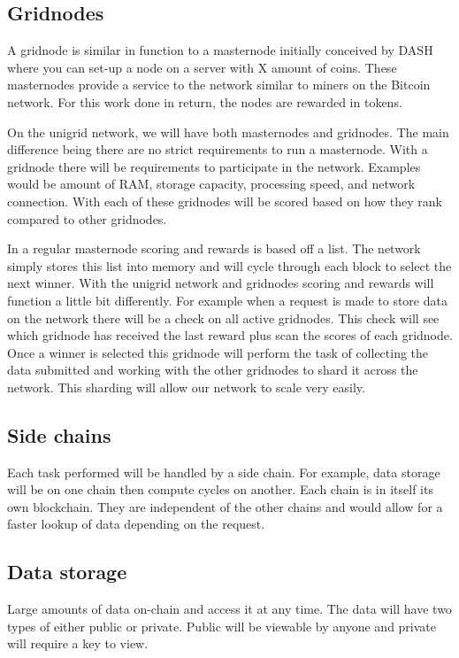 \documentclass[12pt]{article}
\begin{document}
\subsection*{Gridnodes}


A gridnode is similar in function to a masternode initially conceived by DASH where you can set-up a node on a server with X amount of coins. These masternodes provide a service to the network similar to miners on the Bitcoin network. For this work done in return, the nodes are rewarded in tokens.

On the unigrid network, we will have both masternodes and gridnodes. The main difference being there are no strict requirements to run a masternode. With a gridnode there will be requirements to participate in the network. Examples would be amount of RAM, storage capacity, processing speed, and network connection. With each of these gridnodes will be scored based on how they rank compared to other gridnodes.

In a regular masternode scoring and rewards is based off a list. The network simply stores this list into memory and will cycle through each block to select the next winner. With the unigrid network and gridnodes scoring and rewards will function a little bit differently. For example when a request is made to store data on the network there will be a check on all active gridnodes. This check will see which gridnode has received the last reward plus scan the scores of each gridnode. Once a winner is selected this gridnode will perform the task of collecting the data submitted and working with the other gridnodes to shard it across the network. This sharding will allow our network to scale very easily.



\subsection*{Side chains}
Each task performed will be handled by a side chain. For example, data storage will be on one chain then compute cycles on another. Each chain is in itself its own blockchain. They are independent of the other chains and would allow for a faster lookup of data depending on the request.

\subsection*{Data storage}
Large amounts of data on-chain and access it at any time. The data will have two types of either public or private. Public will be viewable by anyone and private will require a key to view.
\end{document}
